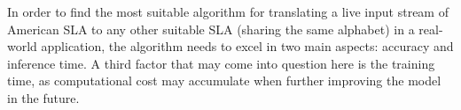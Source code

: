 In order to find the most suitable algorithm for translating a live input stream of American SLA to any other suitable SLA (sharing the same alphabet) in a real-world application, the algorithm needs to excel in two main aspects: accuracy and inference time. A third factor that may come into question here is the training time, as computational cost may accumulate when further improving the model in the future.